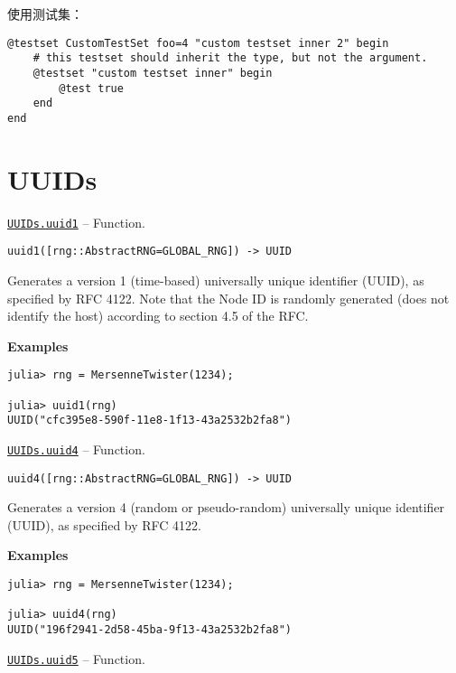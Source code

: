 使用测试集：




\begin{verbatim}
@testset CustomTestSet foo=4 "custom testset inner 2" begin
    # this testset should inherit the type, but not the argument.
    @testset "custom testset inner" begin
        @test true
    end
end
\end{verbatim}





\hypertarget{2767829618755343548}{}


\chapter{UUIDs}


\hypertarget{16892127995397163681}{} 
\hyperlink{16892127995397163681}{\texttt{UUIDs.uuid1}}  -- {Function.}

\begin{adjustwidth}{2em}{0pt}


\begin{verbatim}
uuid1([rng::AbstractRNG=GLOBAL_RNG]) -> UUID
\end{verbatim}

Generates a version 1 (time-based) universally unique identifier (UUID), as specified by RFC 4122. Note that the Node ID is randomly generated (does not identify the host) according to section 4.5 of the RFC.

\textbf{Examples}


\begin{verbatim}
julia> rng = MersenneTwister(1234);

julia> uuid1(rng)
UUID("cfc395e8-590f-11e8-1f13-43a2532b2fa8")
\end{verbatim}



\end{adjustwidth}
\hypertarget{15125074142528432744}{} 
\hyperlink{15125074142528432744}{\texttt{UUIDs.uuid4}}  -- {Function.}

\begin{adjustwidth}{2em}{0pt}


\begin{verbatim}
uuid4([rng::AbstractRNG=GLOBAL_RNG]) -> UUID
\end{verbatim}

Generates a version 4 (random or pseudo-random) universally unique identifier (UUID), as specified by RFC 4122.

\textbf{Examples}


\begin{verbatim}
julia> rng = MersenneTwister(1234);

julia> uuid4(rng)
UUID("196f2941-2d58-45ba-9f13-43a2532b2fa8")
\end{verbatim}



\end{adjustwidth}
\hypertarget{16798189732863707215}{} 
\hyperlink{16798189732863707215}{\texttt{UUIDs.uuid5}}  -- {Function.}

